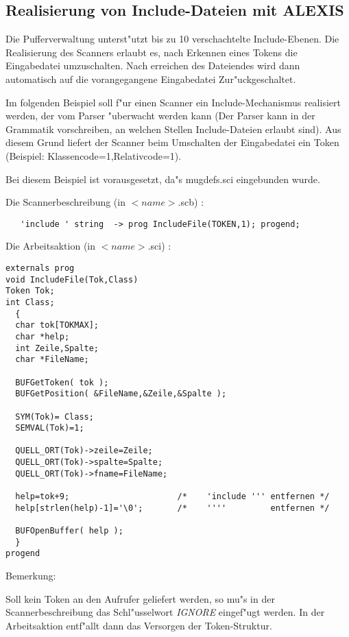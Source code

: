 \subsection{Realisierung von Include-Dateien mit ALEXIS}
Die Pufferverwaltung unterst"utzt bis zu 10 verschachtelte Include-Ebenen. Die
Realisierung des Scanners erlaubt es, nach Erkennen eines Tokens die
Eingabedatei umzuschalten. Nach erreichen des Dateiendes wird dann automatisch
auf die vorangegangene Eingabedatei Zur"uckgeschaltet.

Im folgenden Beispiel soll f"ur einen Scanner ein Include-Mechanismus
realisiert werden, der vom Parser "uberwacht werden kann (Der Parser
kann in der Grammatik vorschreiben, an welchen Stellen Include-Dateien
erlaubt sind). Aus diesem Grund liefert der Scanner beim Umschalten der
Eingabedatei ein Token (Beispiel: Klassencode=1,Relativcode=1).

Bei diesem Beispiel ist vorausgesetzt, da"s mugdefs.sci eingebunden wurde.

Die Scannerbeschreibung (in $<name>$.scb) :

\begin{verbatim}
   'include ' string  -> prog IncludeFile(TOKEN,1); progend; 
\end{verbatim}

Die Arbeitsaktion (in $<name>$.sci) :

\begin{verbatim}
externals prog
void IncludeFile(Tok,Class)
Token Tok;
int Class;
  { 
  char tok[TOKMAX];
  char *help;
  int Zeile,Spalte;
  char *FileName;

  BUFGetToken( tok );
  BUFGetPosition( &FileName,&Zeile,&Spalte );  

  SYM(Tok)= Class;
  SEMVAL(Tok)=1;

  QUELL_ORT(Tok)->zeile=Zeile;
  QUELL_ORT(Tok)->spalte=Spalte;
  QUELL_ORT(Tok)->fname=FileName;

  help=tok+9;                      /*    'include ''' entfernen */
  help[strlen(help)-1]='\0';       /*    ''''         entfernen */

  BUFOpenBuffer( help );
  }
progend
\end{verbatim}

\bigskip

Bemerkung:

Soll kein Token an den Aufrufer geliefert werden, so mu"s in der
Scannerbeschreibung das Schl"usselwort {\it IGNORE\/} eingef"ugt werden.
In der Arbeitsaktion entf"allt dann das Versorgen der Token-Struktur.
